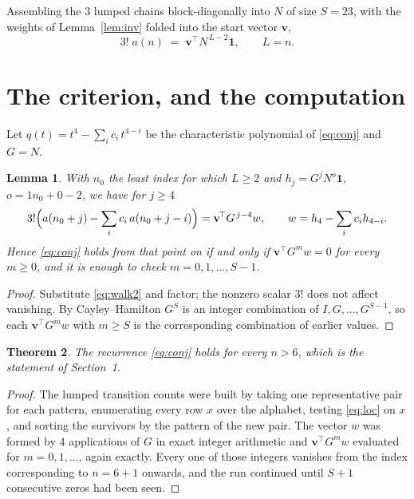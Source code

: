 \documentclass[11pt,a4paper]{article}
\theoremstyle{plain}
\newtheorem{theorem}{Theorem}
\newtheorem{lemma}[theorem]{Lemma}
\theoremstyle{definition}
\begin{document}
Assembling the $3$ lumped chains block-diagonally into $N$ of size $S=23$, with the
weights of Lemma~\ref{lem:inv} folded into the start vector $\mathbf{v}$,
\begin{equation}\label{eq:walk2}
3!\;a(n)\;=\;\mathbf{v}^{\!\top}N^{\,L-2}\mathbf{1},\qquad L=n .
\end{equation}

\section{The criterion, and the computation}

Let $q(t)=t^{4}-\sum_i c_i\,t^{4-i}$ be the characteristic polynomial of
\eqref{eq:conj} and $G=N$.

\begin{lemma}\label{lem:crit}
With $n_0$ the least index for which $L\ge2$ and $h_j=G^{j}N^{o}\mathbf{1}$,
$o=1n_0+0-2$, we have for $j\ge4$
\[
3!\Bigl(a(n_0+j)-\sum_i c_i\,a(n_0+j-i)\Bigr)
=\mathbf{v}^{\!\top}G^{\,j-4}w,\qquad
w=h_{4}-\sum_i c_i h_{4-i} .
\]
Hence \eqref{eq:conj} holds from that point on if and only if
$\mathbf{v}^{\!\top}G^{m}w=0$ for every $m\ge0$, and it is enough to check
$m=0,1,\dots,S-1$.
\end{lemma}

\begin{proof}
Substitute \eqref{eq:walk2} and factor; the nonzero scalar $3!$ does not affect
vanishing. By Cayley--Hamilton $G^{S}$ is an integer combination of $I,G,\dots,G^{S-1}$,
so each $\mathbf{v}^{\!\top}G^{m}w$ with $m\ge S$ is the corresponding combination of
earlier values.
\end{proof}

\begin{theorem}
The recurrence \eqref{eq:conj} holds for every $n>6$, which is the statement of
Section~1.
\end{theorem}

\begin{proof}
The lumped transition counts were built by taking one representative pair for each pattern,
enumerating every row $x$ over the alphabet, testing \eqref{eq:loc} on $x$, and sorting
the survivors by the pattern of the new pair. The vector $w$ was formed by $4$
applications of $G$ in exact integer arithmetic and $\mathbf{v}^{\!\top}G^{m}w$
evaluated for $m=0,1,\dots$, again exactly. Every one of those integers vanishes from the
index corresponding to $n=6+1$ onwards, and the run continued until $S+1$ consecutive
zeros had been seen.
\end{proof}
\end{document}
